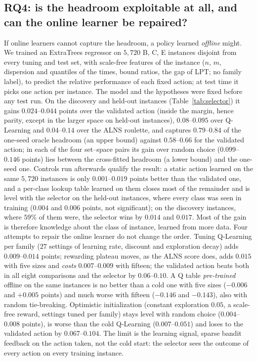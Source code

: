 \documentclass[conference,a4paper]{IEEEtran}
\begin{document}
\subsection{RQ4: is the headroom exploitable at all, and can the online learner be repaired?}
\label{sec:selector}
If online learners cannot capture the headroom, a policy learned \emph{offline} might. We trained an ExtraTrees regressor on $5{,}720$ B, C, E instances disjoint from every tuning and test set, with scale-free features of the instance ($n$, $m$, dispersion and quantiles of the times, bound ratios, the gap of LPT; no family label), to predict the relative performance of each fixed action; at test time it picks one action per instance.
The model and the hypotheses were fixed before any test run. On the discovery and held-out instances (Table~\ref{tab:selector}) it gains $0.024$--$0.044$ points over the validated action (inside the margin, hence parity, except in the larger space on held-out instances), $0.08$--$0.095$ over Q-Learning and $0.04$--$0.14$ over the ALNS roulette, and captures $0.79$--$0.84$ of the one-seed oracle headroom (an upper bound) against $0.58$--$0.66$ for the validated action; in each of the four set--space pairs its gain over random choice ($0.099$--$0.146$ points) lies between the cross-fitted headroom (a lower bound) and the one-seed one. Controls run afterwards qualify the result: a static action learned on the same $5{,}720$ instances is only $0.001$--$0.019$ points better than the validated one, and a per-class lookup table learned on them
closes most of the remainder and is level with the selector on the held-out instances, where every class was seen in training ($0.004$ and $0.006$ points, not significant); on the discovery instances, where $59\%$ of them were, the selector wins by $0.014$ and $0.017$. Most of the gain is therefore knowledge about the class of instance, learned from more data.
Four attempts to repair the online learner do not change the order. Tuning Q-Learning per family ($27$ settings of learning rate, discount and exploration decay) adds $0.009$--$0.014$ points; rewarding plateau moves, as the ALNS score does, adds $0.015$ with five sizes and \emph{costs} $0.007$--$0.009$ with fifteen; the validated action beats both in all eight comparisons and the selector by $0.06$--$0.10$. A Q table \emph{pre-trained} offline on the same instances is no better than a cold one with five sizes
($-0.006$ and $+0.005$ points) and much worse with fifteen ($-0.146$ and $-0.143$), also with random tie-breaking. Optimistic initialization (constant exploration $0.05$, a scale-free reward, settings tuned per family) stays level with random choice ($0.004$--$0.008$ points), is worse than the cold Q-Learning ($0.007$--$0.051$) and loses to the validated action by $0.067$--$0.104$. The limit is the learning signal, sparse bandit feedback on the action taken, not the cold start: the selector sees the outcome of every action on every training instance.
\end{document}
